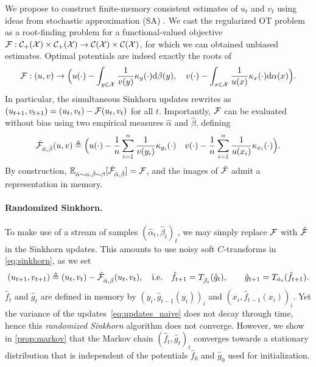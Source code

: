 We propose to construct finite-memory consistent estimates of $u_t$ and $v_t$ using
ideas from stochastic approximation (SA) \cite{robbins1951stochastic}. We cast
the regularized OT problem as a root-finding problem for a functional-valued
objective $\Ff: \Cc_{+}(\Xx) \times \Cc_{+}(\Xx) \to \Cc(\Xx) \times \Cc(\Xx)$,
for which we can obtained unbiased estimates. Optimal potentials are indeed
exactly the roots of
% 
\begin{equation}
    \Ff: (u, v) \to 
    \Big(u(\cdot) - \int_{y \in \Xx}
     \frac{1}{v(y)} \kappa_y(\cdot)  \d \beta(y),\quad
    v(\cdot) - \int_{x \in \Xx}
    \frac{1}{u(x)}  \kappa_x(\cdot)  \d \alpha(x)\Big).
\end{equation}
% 
In particular, the simultaneous Sinkhorn updates rewrites as $(u_{t+1}, v_{t+1}) = (u_{t},
v_{t}) - \Ff(u_t, v_t)$ for all $t$. Importantly, $\Ff$ can be
evaluated without bias using two empirical measures $\hat \alpha$ and
$\hat \beta$, defining
% 
\begin{equation}
    \hat \Ff_{\hat \alpha, \hat \beta}(u, v) \triangleq 
    \Big(u(\cdot) - \frac{1}{n} \sum_{i=1}^n
    \frac{1}{v(y_i)} \kappa_{y_i}(\cdot)\quad
    v(\cdot) - \frac{1}{n} \sum_{i=1}^n
   \frac{1}{u(x_i)}  \kappa_{x_i}(\cdot) \Big).
\end{equation}
By construction, $\EE_{\hat \alpha \sim \alpha, \hat \beta \sim \beta} [\hat \Ff_{\hat
\alpha, \hat \beta}] = \Ff$, and the images of $\hat \Ff$ admit a representation in memory.




\paragraph{Randomized Sinkhorn.}To make use of a stream of samples $(\hat \alpha_t, \hat
 \beta_t)_t$, we may simply replace $\Ff$ with $\hat \Ff$ in the Sinkhorn updates.
 This amounts to use noisy soft $C$-transforms in \eqref{eq:sinkhorn}, as we set
\begin{equation}\label{eq:updates_naive}
    (u_{t+1}, v_{t+1}) \triangleq (u_{t},
    v_{t}) - \hat \Ff_{\hat \alpha, \hat \beta}(u_t, v_t),\quad\text{i.e.}\quad
     \hat f_{t+1} = \Ctrans{\hat g_t}{\hat \beta_t},
    \qquad \hat g_{t+1} = \Ctrans{\hat f_{t+1}}{\hat \alpha_t}.
\end{equation}
%
$\hat f_t$ and $\hat g_t$ are defined in memory by $(y_i, \hat g_{t-1}(y_i))_i$ and $(x_i,
\hat f_{t-1}(x_i))_i$. Yet the variance of the updates~\eqref{eq:updates_naive} does not
decay through time, hence this \textit{randomized Sinkhorn} algorithm does not
converge. However, we show in
\autoref{prop:markov} that the Markov chain ${(\hat f_t, \hat g_t)}_t$ converges
towards a stationary distribution that is independent of the potentials $\hat f_0$ and $\hat g_0$ used for
initialization.

